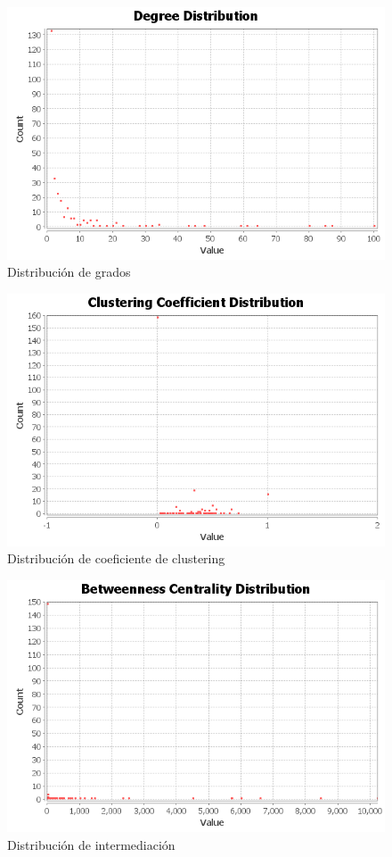 \begin{figure}[H]
	\centering
	\includegraphics[width=12cm]{img/degree-distribution}
	\caption{Distribución de grados}
	\label{fig:degree-distribution}
\end{figure}

\begin{figure}[H]
	\centering
	\includegraphics[width=12cm]{img/clustering-coefficient}
	\caption{Distribución de coeficiente de clustering}
	\label{fig:clustering-coefficient}
\end{figure}

\begin{figure}[H]
	\centering
	\includegraphics[width=12cm]{img/betweenness-centrality-distribution}
	\caption{Distribución de intermediación}
	\label{fig:betweenness-centrality-distribution}
\end{figure}

